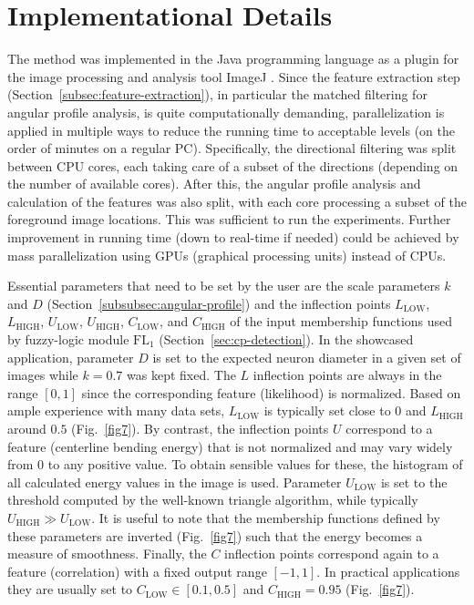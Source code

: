 \section{Implementational Details}
\label{sec:implementation-details}
The method was implemented in the Java programming language as a plugin for the image processing and analysis tool ImageJ \cite{abramoff2004image, schneider2012nih}. Since the feature extraction step (Section~\ref{subsec:feature-extraction}), in particular the matched filtering for angular profile analysis, is quite computationally demanding, parallelization is applied in multiple ways to reduce the running time to acceptable levels (on the order of minutes on a regular PC). Specifically, the directional filtering was split between CPU cores, each taking care of a subset of the directions (depending on the number of available cores). After this, the angular profile analysis and calculation of the features was also split, with each core processing a subset of the foreground image locations. This was sufficient to run the experiments. Further improvement in running time (down to real-time if needed) could be achieved by mass parallelization using GPUs (graphical processing units) instead of CPUs.

Essential parameters that need to be set by the user are the scale parameters $k$ and $D$ (Section~\ref{subsubsec:angular-profile}) and the inflection points $L_{\mathrm{LOW}}$, $L_{\mathrm{HIGH}}$, $U_{\mathrm{LOW}}$, $U_{\mathrm{HIGH}}$, $C_{\mathrm{LOW}}$, and $C_{\mathrm{HIGH}}$ of the input membership functions used by fuzzy-logic module $\textrm{FL}_{1}$ (Section~\ref{sec:cp-detection}). In the showcased application, parameter $D$ is set to the expected neuron diameter in a given set of images while $k=0.7$ was kept fixed. The $L$ inflection points are always in the range $[0,1]$ since the corresponding feature (likelihood) is normalized. Based on ample experience with many data sets, $L_{\mathrm{LOW}}$ is typically set close to 0 and $L_{\mathrm{HIGH}}$ around $0.5$ (Fig.~\ref{fig7}). By contrast, the inflection points $U$ correspond to a feature (centerline bending energy) that is not normalized and may vary widely from $0$ to any positive value. To obtain sensible values for these, the histogram of all calculated energy values in the image is used. Parameter $U_{\mathrm{LOW}}$ is set to the threshold computed by the well-known triangle algorithm, while typically $U_{\mathrm{HIGH}}\gg U_{\mathrm{LOW}}$. It is useful to note that the membership functions defined by these parameters are inverted (Fig.~\ref{fig7}) such that the energy becomes a measure of smoothness. Finally, the $C$ inflection points correspond again to a feature (correlation) with a fixed output range $[-1,1]$. In practical applications they are usually set to $C_{\mathrm{LOW}}\in[0.1,0.5]$ and $C_{\mathrm{HIGH}}=0.95$  (Fig.~\ref{fig7}).

